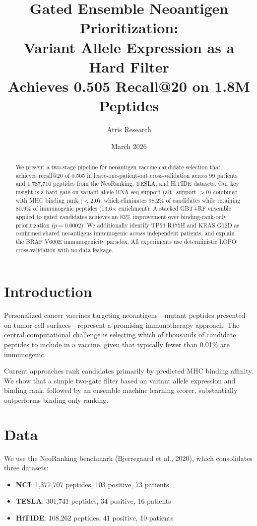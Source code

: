 \documentclass[11pt,twocolumn]{article}
\title{Gated Ensemble Neoantigen Prioritization:\\Variant Allele Expression as a Hard Filter\\Achieves 0.505 Recall@20 on 1.8M Peptides}
\author{Atris Research}
\date{March 2026}
\begin{document}
\maketitle

\begin{abstract}
We present a two-stage pipeline for neoantigen vaccine candidate selection
that achieves recall@20 of 0.505 in leave-one-patient-out cross-validation
across 99 patients and 1,787,710 peptides from the NeoRanking, TESLA, and
HiTIDE datasets. Our key insight is a hard gate on variant allele RNA-seq
support (alt\_support $> 0$) combined with MHC binding rank ($< 2.0$), which
eliminates 98.2\% of candidates while retaining 80.9\% of immunogenic
peptides (13.6$\times$ enrichment). A stacked GBT+RF ensemble applied to
gated candidates achieves an 83\% improvement over binding-rank-only
prioritization ($p = 0.0002$). We additionally identify TP53 R175H and
KRAS G12D as confirmed shared neoantigens immunogenic across independent
patients, and explain the BRAF V600E immunogenicity paradox. All experiments
use deterministic LOPO cross-validation with no data leakage.
\end{abstract}

\section{Introduction}

Personalized cancer vaccines targeting neoantigens---mutant peptides presented
on tumor cell surfaces---represent a promising immunotherapy approach.
The central computational challenge is selecting which of thousands of
candidate peptides to include in a vaccine, given that typically fewer than
0.01\% are immunogenic.

Current approaches rank candidates primarily by predicted MHC binding
affinity. We show that a simple two-gate filter based on variant allele
expression and binding rank, followed by an ensemble machine learning
scorer, substantially outperforms binding-only ranking.

\section{Data}

We use the NeoRanking benchmark (Bjerregaard et al., 2020), which
consolidates three datasets:

\begin{itemize}[nosep]
\item \textbf{NCI}: 1,377,707 peptides, 103 positive, 73 patients
\item \textbf{TESLA}: 301,741 peptides, 34 positive, 16 patients
\item \textbf{HiTIDE}: 108,262 peptides, 41 positive, 10 patients
\end{itemize}
\end{document}
